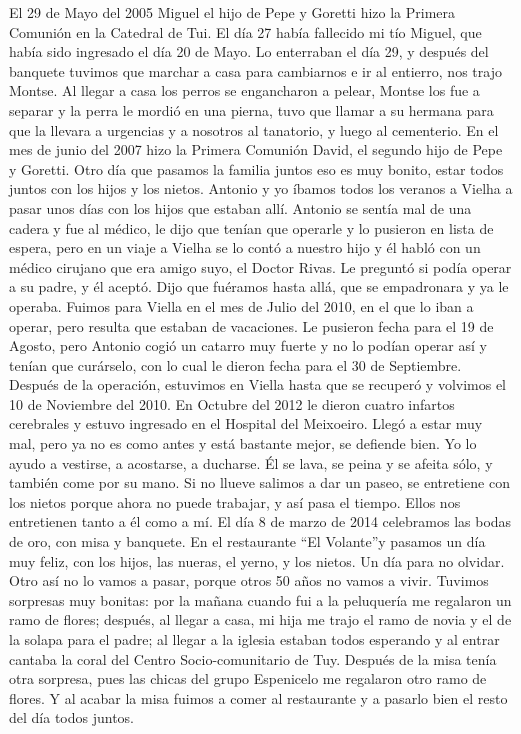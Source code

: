 \documentclass[12pt,a5paper]{book}
\begin{document}
El 29 de Mayo del 2005 Miguel el hijo de Pepe y Goretti hizo la Primera Comunión en la Catedral de Tui. El día 27 había fallecido mi tío Miguel, que había sido ingresado el día 20 de Mayo. Lo enterraban el día 29, y después del banquete tuvimos que marchar a casa para cambiarnos e ir al entierro, nos trajo Montse. Al llegar a casa los perros se engancharon a pelear, Montse los fue a separar y la perra le mordió en una pierna, tuvo que llamar a su hermana para que la llevara a urgencias y a nosotros al tanatorio, y luego al cementerio.
En el mes de junio del 2007 hizo la Primera Comunión David, el segundo hijo de Pepe y Goretti. Otro día que pasamos la familia juntos eso es muy bonito, estar todos juntos con los hijos y los nietos.
Antonio y yo íbamos todos los veranos a Vielha a pasar unos días con los hijos que estaban allí. Antonio se sentía mal de una cadera y fue al médico, le dijo que tenían que operarle y lo pusieron en lista de espera, pero en un viaje a Vielha se lo contó a nuestro hijo y él habló con un médico cirujano que era amigo suyo, el Doctor Rivas. Le preguntó si podía operar a su padre, y él aceptó. Dijo que fuéramos hasta allá, que se empadronara y ya le operaba. Fuimos para Viella en el mes de Julio del 2010, en el que lo iban a operar, pero resulta que estaban de vacaciones. Le pusieron fecha para el 19 de Agosto, pero Antonio cogió un catarro muy fuerte y no lo podían operar así y tenían que curárselo, con lo cual le dieron fecha para el 30 de Septiembre. Después de la operación, estuvimos en Viella hasta que se recuperó y volvimos el 10 de Noviembre del 2010.
En Octubre del 2012 le dieron cuatro infartos cerebrales y estuvo ingresado en el Hospital del Meixoeiro. Llegó a estar muy mal, pero ya no es como antes y está bastante mejor, se defiende bien. Yo lo ayudo a vestirse, a acostarse, a ducharse. Él se lava, se peina y se afeita sólo, y también come por su mano. Si no llueve salimos a dar un paseo, se entretiene con los nietos porque ahora no puede trabajar, y así pasa el tiempo. Ellos nos entretienen tanto a él como a mí.
El día 8 de marzo de 2014 celebramos las bodas de oro, con misa y banquete. En el restaurante “El Volante”y pasamos un día muy feliz, con los hijos, las nueras, el yerno, y los nietos. Un día para no olvidar. Otro así no lo vamos a pasar, porque otros 50 años no vamos a vivir. Tuvimos sorpresas muy bonitas: por la mañana cuando fui a la peluquería me regalaron un ramo de flores; después, al llegar a casa, mi hija me trajo el ramo de novia y el de la solapa para el padre; al llegar a la iglesia estaban todos esperando y al entrar cantaba la coral del Centro Socio-comunitario de Tuy. Después de la misa tenía otra sorpresa, pues las chicas del grupo Espenicelo me regalaron otro ramo de flores. Y al acabar la misa fuimos a comer al restaurante y a pasarlo bien el resto del día todos juntos.
\end{document}
